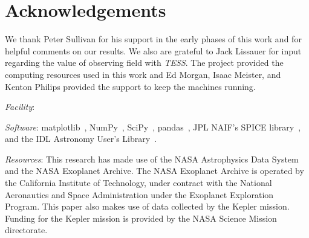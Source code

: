 \section*{Acknowledgements}
We thank Peter Sullivan for his support in the early phases of this work and for helpful comments on our results.
We also are grateful to Jack Lissauer for input regarding the value of observing \keplers field with \textit{TESS}.
The \tess project provided the computing resources used in this work and Ed Morgan, Isaac Meister, and Kenton Philips provided the support to keep the machines running.

\vspace{0.5cm}
\textit{Facility}: \tess

\textit{Software}: matplotlib~\citep{hunter_matplotlib_2007}, NumPy~\citep{walt_numpy_2011}, SciPy~\citep{jones_scipy_2001}, pandas~\citep{mckinneypandas}, JPL NAIF's SPICE library~\citep{acton_SPICE_1996}, and the IDL Astronomy User's Library~\citep{landsman_idl_1995}.

\textit{Resources}: This research has made use of the NASA Astrophysics Data System and the NASA Exoplanet Archive. The NASA Exoplanet Archive is operated by the California Institute of Technology, under contract with the National Aeronautics and Space Administration under the Exoplanet Exploration Program.
This paper also makes use of data collected by the Kepler mission. Funding for the Kepler mission is provided by the NASA Science Mission directorate.
